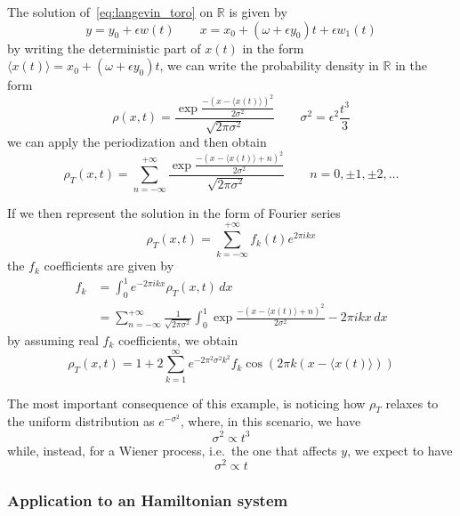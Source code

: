 The solution of~\eqref{eq:langevin_toro} on \(\mathbb{R}\) is given by
\begin{equation}
	y = y_0 + \epsilon w(t) \qquad x = x_0 + (\omega + \epsilon y_0) t + \epsilon w_1(t)
\end{equation}
by writing the deterministic part of \(x(t)\) in the form \(\langle x(t) \rangle = x_0 + (\omega + \epsilon y_0) t\), we can write the probability density in \(\mathbb{R}\) in the form
\begin{equation}
	\rho(x,t) = \frac{\exp{\frac{-(x-\langle x(t)\rangle)^2}{2\sigma^2}}}{\sqrt{2\pi\sigma^2}} \qquad \sigma^2 = \epsilon^2 \frac{t^3}{3}
\end{equation}
we can apply the periodization and then obtain
\begin{equation}
	\rho_T(x,t) = \sum_{n=-\infty}^{+\infty} \frac{\exp{\frac{-(x-\langle x(t)\rangle + n)^2}{2\sigma^2}}}{\sqrt{2\pi\sigma^2}} \qquad n = 0,\pm 1, \pm 2, \ldots
\end{equation}

If we then represent the solution in the form of Fourier series
\begin{equation}
	\rho_T(x,t) = \sum_{k=-\infty}^{+\infty} f_k(t)e^{2\pi i k x}
\end{equation}
the \(f_k\) coefficients are given by
\begin{align}
	f_k &= \int_0^1 e^{-2\pi i k x} \rho_T(x,t)\,dx \\
	&= \sum_{n=-\infty}^{+\infty} \frac{1}{\sqrt{2\pi\sigma^2}} \int_0^1 \exp{\frac{-(x-\langle x(t) \rangle + n)^2}{2\sigma^2} -2\pi i k x}\,dx
\end{align}
by assuming real \(f_k\) coefficients, we obtain
\begin{equation}
	\rho_T(x,t) = 1+2\sum_{k=1}^\infty e^{-2\pi^2\sigma^2k^2} f_k \cos(2\pi k (x-\langle x(t) \rangle))
\end{equation}

The most important consequence of this example, is noticing how \(\rho_T\) relaxes to the uniform distribution as \(e^{-\sigma^2}\), where, in this scenario, we have
\begin{equation}
	\sigma^2 \propto t^{3}
\end{equation}
while, instead, for a Wiener process, i.e.\ the one that affects \(y\), we expect to have
\begin{equation}
	\sigma^2 \propto t
\end{equation}

\subsubsection*{Application to an Hamiltonian system}

